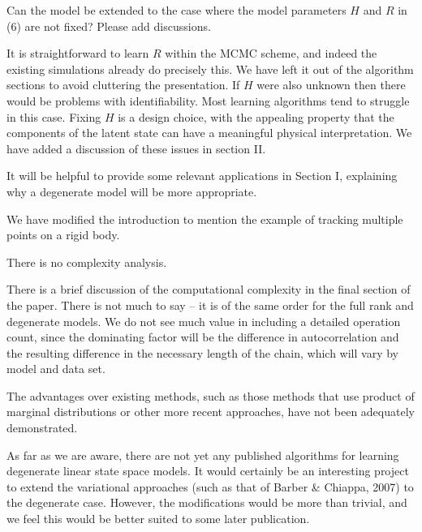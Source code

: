 \documentclass{article}
\newenvironment{review}[0]{\begin{itshape}\color{Gray}\noindent}{\end{itshape}\vspace{0.4cm}}
\newenvironment{response}[0]{\noindent}{\vspace{0.4cm}}
\begin{document}
\begin{review}
Can the model be extended to the case where the model parameters $H$ and $R$ in (6) are not fixed? Please add discussions.
\end{review}

\begin{response}
 It is straightforward to learn $R$ within the MCMC scheme, and indeed the existing simulations already do precisely this. We have left it out of the algorithm sections to avoid cluttering the presentation. If $H$ were also unknown then there would be problems with identifiability. Most learning algorithms tend to struggle in this case. Fixing $H$ is a design choice, with the appealing property that the components of the latent state can have a meaningful physical interpretation. We have added a discussion of these issues in section II.
\end{response}

\begin{review}
It will be helpful to provide some relevant applications in Section I, explaining why a degenerate model will be more appropriate.
\end{review}

\begin{response}
We have modified the introduction to mention the example of tracking multiple points on a rigid body.
\end{response}

\begin{review}
There is no complexity analysis.
\end{review}

\begin{response}
There is a brief discussion of the computational complexity in the final section of the paper. There is not much to say -- it is of the same order for the full rank and degenerate models. We do not see much value in including a detailed operation count, since the dominating factor will be the difference in autocorrelation and the resulting difference in the necessary length of the chain, which will vary by model and data set.
\end{response}

\begin{review}
The advantages over existing methods, such as those methods that use product of marginal distributions or other more recent approaches, have not been adequately demonstrated.
\end{review}

\begin{response}
 As far as we are aware, there are not yet any published algorithms for learning degenerate linear state space models. It would certainly be an interesting project to extend the variational approaches (such as that of Barber \& Chiappa, 2007) to the degenerate case. However, the modifications would be more than trivial, and we feel this would be better suited to some later publication.
\end{response}
\end{document}
